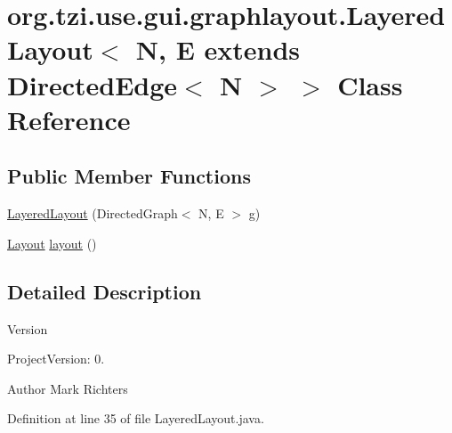 \hypertarget{classorg_1_1tzi_1_1use_1_1gui_1_1graphlayout_1_1_layered_layout_3_01_n_00_01_e_01extends_01_directed_edge_3_01_n_01_4_01_4}{\section{org.\-tzi.\-use.\-gui.\-graphlayout.\-Layered\-Layout$<$ N, E extends Directed\-Edge$<$ N $>$ $>$ Class Reference}
\label{classorg_1_1tzi_1_1use_1_1gui_1_1graphlayout_1_1_layered_layout_3_01_n_00_01_e_01extends_01_directed_edge_3_01_n_01_4_01_4}
}
\subsection*{Public Member Functions}
\begin{DoxyCompactItemize}
\item 
\hyperlink{classorg_1_1tzi_1_1use_1_1gui_1_1graphlayout_1_1_layered_layout_3_01_n_00_01_e_01extends_01_directed_edge_3_01_n_01_4_01_4_ad7252dfd701b444126ea8318349fed7c}{Layered\-Layout} (Directed\-Graph$<$ N, E $>$ g)
\item 
\hyperlink{classorg_1_1tzi_1_1use_1_1gui_1_1graphlayout_1_1_layout}{Layout} \hyperlink{classorg_1_1tzi_1_1use_1_1gui_1_1graphlayout_1_1_layered_layout_3_01_n_00_01_e_01extends_01_directed_edge_3_01_n_01_4_01_4_a46215578287139137457f2b1300fa392}{layout} ()
\end{DoxyCompactItemize}


\subsection{Detailed Description}
\begin{DoxyVersion}{Version}

\end{DoxyVersion}
\begin{DoxyParagraph}{Project\-Version\-:}
0. 
\end{DoxyParagraph}
\begin{DoxyAuthor}{Author}
Mark Richters 
\end{DoxyAuthor}


Definition at line 35 of file Layered\-Layout.\-java.



